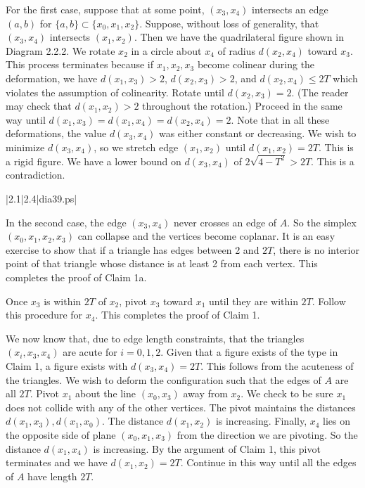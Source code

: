 For the first case, suppose that at some point, $(x_3,x_4)$ intersects an edge 
$(a,b)$ for $\{a,b\}\subset\{x_0,x_1,x_2\}$.  Suppose, without loss of generality, 
that $(x_3,x_4)$ intersects $(x_1,x_2)$.  Then we have the quadrilateral 
figure shown in Diagram 2.2.2.  We rotate $x_2$ in a circle about $x_4$ of radius
$d(x_2,x_4)$ toward $x_3$.  This process terminates because if $x_1,x_2,x_3$ 
become colinear during the deformation, we have  $d(x_1,x_3)>2$, $d(x_2,x_3)>2$,
and $d(x_2,x_4)\le2T$ which violates the assumption of colinearity.
Rotate until  $d(x_2,x_3)=2$.  
(The reader may check that $d(x_1,x_2)>2$ throughout the rotation.)
Proceed in the same way until $d(x_1,x_3)=
d(x_1,x_4)=d(x_2,x_4)=2$.  Note that in all these deformations, the
value $d(x_3,x_4)$ was either constant or decreasing.  We wish to minimize $d(x_3,x_4)$, so 
we stretch edge $(x_1,x_2)$ until $d(x_1,x_2)=2T$.  This is a rigid figure.
We have a lower bound on $d(x_3,x_4)$ of $2\sqrt{4-T^2}>2T.$  This is a
contradiction.


\gram|2.1|2.4|dia39.ps|  %


In the second case, the edge $(x_3,x_4)$ never crosses an edge of $A$.
So the simplex $(x_0,x_1,x_2,x_3)$ can collapse and the vertices become
 coplanar.  It is an easy exercise to show that if
a triangle has edges between 2 and $2T$, there is no interior point of that triangle whose distance is at least 2 from each vertex.
 This completes the proof of Claim 1a.

Once $x_3$ is within $2T$ of $x_2$, pivot $x_3$ toward $x_1$ until they are 
within $2T$.  Follow this procedure for $x_4$.  
This completes the proof of Claim 1.

\smallskip

We now know that, due to edge length constraints, that the triangles $(x_i,x_3,x_4)$ are acute for 
$i=0,1,2$. Given that a figure exists of the type in Claim 1, 
a figure exists with $d(x_3,x_4)=2T$.  This follows from the acuteness of 
the triangles.  We wish to deform the configuration such that 
the edges of $A$ are all $2T$.  Pivot $x_1$ about the line $(x_0,x_3)$ away from $x_2$.  
We check to be sure $x_1$ does not collide with any of the other vertices. 
The pivot maintains the distances $d(x_1,x_3),d(x_1,x_0)$.  
The distance $d(x_1,x_2)$ is increasing.  Finally, $x_4$ lies on the opposite side of 
plane $(x_0,x_1,x_3)$ from the direction we are pivoting.  So the distance 
$d(x_1,x_4)$ is increasing.   By the argument of Claim 1, 
this pivot terminates and we have $d(x_1,x_2)=2T$.  
Continue in this way until all the edges of $A$ have length $2T$.  

